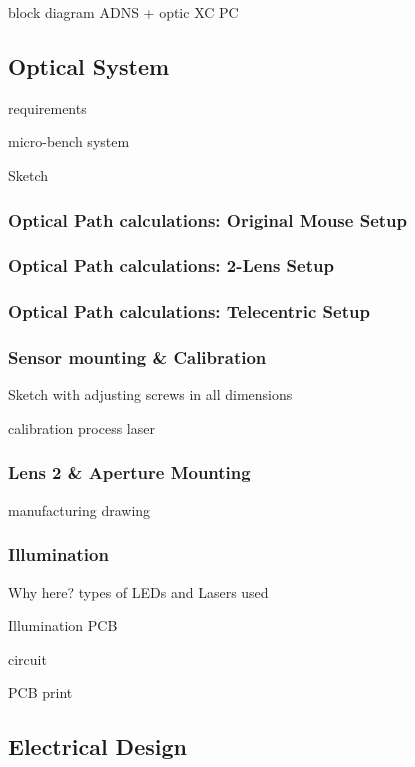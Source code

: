\documentclass[12pt,a4paper]{article}
\begin{document}
block diagram
  ADNS + optic
  XC
  PC

\subsection{Optical System}
  requirements

micro-bench system

Sketch

\subsubsection{Optical Path calculations: Original Mouse Setup}

\subsubsection{Optical Path calculations: 2-Lens Setup}

\subsubsection{Optical Path calculations: Telecentric Setup}


\subsubsection{Sensor mounting \& Calibration}

Sketch with adjusting screws in all dimensions

calibration process
  laser

\subsubsection{Lens 2 \& Aperture Mounting}

manufacturing drawing

\subsubsection{Illumination}

  Why here?
  types of LEDs and Lasers used
 
  Illumination PCB

  circuit

  PCB print


\subsection{Electrical Design}
\end{document}

